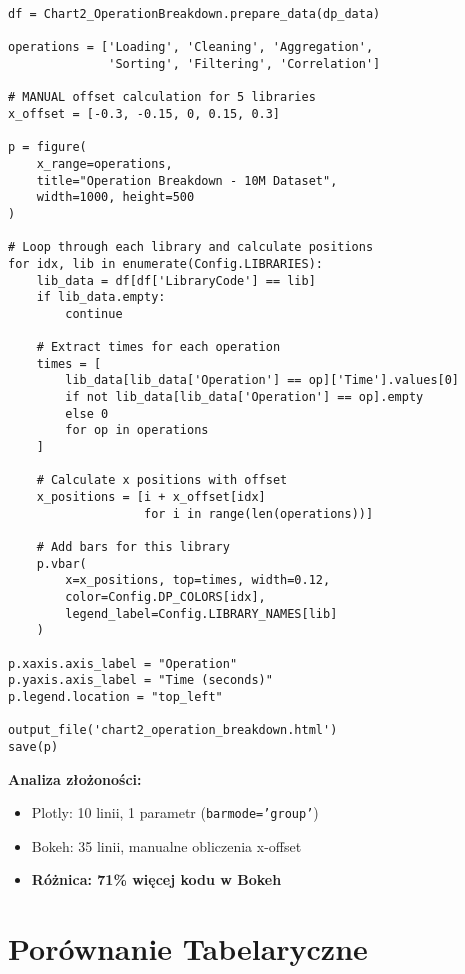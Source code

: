 \documentclass[a4paper,11pt]{article}
\begin{document}
\begin{lstlisting}[caption={Chart 2: Grouped Bars - Bokeh (35 LOC)},label={lst:chart2_bokeh}]
df = Chart2_OperationBreakdown.prepare_data(dp_data)

operations = ['Loading', 'Cleaning', 'Aggregation', 
              'Sorting', 'Filtering', 'Correlation']

# MANUAL offset calculation for 5 libraries
x_offset = [-0.3, -0.15, 0, 0.15, 0.3]

p = figure(
    x_range=operations,
    title="Operation Breakdown - 10M Dataset",
    width=1000, height=500
)

# Loop through each library and calculate positions
for idx, lib in enumerate(Config.LIBRARIES):
    lib_data = df[df['LibraryCode'] == lib]
    if lib_data.empty:
        continue
    
    # Extract times for each operation
    times = [
        lib_data[lib_data['Operation'] == op]['Time'].values[0]
        if not lib_data[lib_data['Operation'] == op].empty 
        else 0
        for op in operations
    ]
    
    # Calculate x positions with offset
    x_positions = [i + x_offset[idx] 
                   for i in range(len(operations))]
    
    # Add bars for this library
    p.vbar(
        x=x_positions, top=times, width=0.12,
        color=Config.DP_COLORS[idx],
        legend_label=Config.LIBRARY_NAMES[lib]
    )

p.xaxis.axis_label = "Operation"
p.yaxis.axis_label = "Time (seconds)"
p.legend.location = "top_left"

output_file('chart2_operation_breakdown.html')
save(p)
\end{lstlisting}

\textbf{Analiza złożoności:}
\begin{itemize}
    \item Plotly: 10 linii, 1 parametr (\texttt{barmode='group'})
    \item Bokeh: 35 linii, manualne obliczenia x-offset
    \item \textbf{Różnica: 71\% więcej kodu w Bokeh}
\end{itemize}

\section{Porównanie Tabelaryczne}
\end{document}
